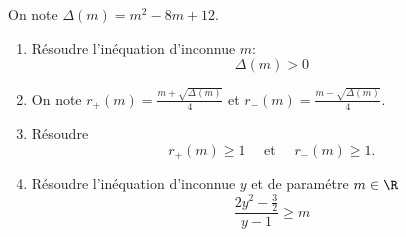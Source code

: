 



\vspace{0.5cm}
\begin{exercice}
On note $\Delta(m) =m^2-8m+12$.  
\begin{enumerate}
\item Résoudre l'inéquation d'inconnue $m$: 
\begin{equation}\tag{$I_1$}
\Delta(m)>0
\end{equation}
\item On note $r_+(m) =\frac{m+\sqrt{\Delta(m)}}{4}$ et $r_-(m) =\frac{m-\sqrt{\Delta(m)}}{4}$.\\
\item Résoudre 
$$r_+(m)\geq 1 \quad \text{ et } \quad r_-(m)\geq 1 .$$
\item  Résoudre l'inéquation d'inconnue $y$ et de paramétre $m\in \R$
\begin{equation}\tag{$I_2$}
  \frac{2y^2-\frac{3}{2}}{y-1}\geq m
\end{equation}
\end{enumerate}
\end{exercice}


